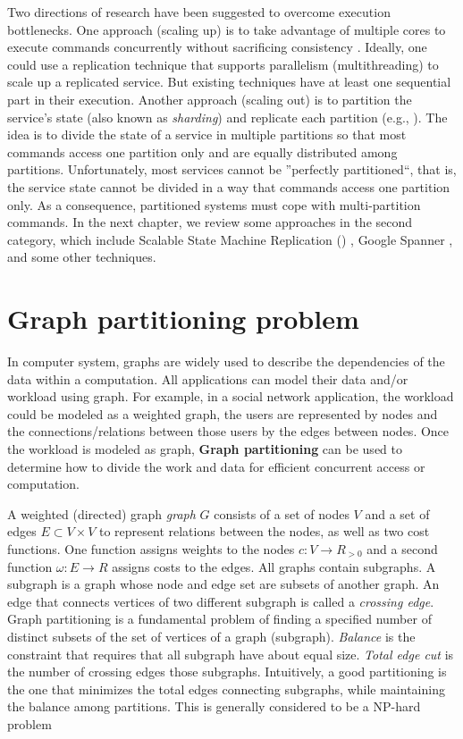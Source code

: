 Two directions of research have been suggested to overcome execution
bottlenecks. One approach (scaling up) is to take advantage of multiple cores to
execute commands concurrently without sacrificing consistency
\cite{Kapritsos:2012um,Marandi:2014bj,Kotla:2004ep,Guo:2014jp}. Ideally, one
could use a replication technique that supports parallelism (multithreading) to
scale up a replicated service. But existing techniques have at least one
sequential part in their execution. Another approach (scaling out) is to
partition the service's state (also known as \emph{sharding}) and replicate each
partition (e.g., \cite{Glendenning:2011kj,Marandi:2011dj}). The idea is to
divide the state of a service in multiple partitions so that most commands
access one partition only and are equally distributed among partitions.
Unfortunately, most services cannot be ''perfectly partitioned``, that is, the
service state cannot be divided in a way that commands access one partition
only. As a consequence, partitioned systems must cope with multi-partition
commands. In the next chapter, we review some approaches in the second category,
which include Scalable State Machine Replication (\ssmr) \cite{bezerra2014ssmr},
Google Spanner \cite{corbett2013spanner}, and some other techniques.


\section{Graph partitioning problem}

In computer system, graphs are widely used to describe the dependencies of the
data within a computation. All applications can model their data and/or workload
using graph. For example, in a social network application, the workload could be
modeled as a weighted graph, the users are represented by nodes and the
connections/relations between those users by the edges between nodes. Once the
workload is modeled as graph, \textbf{Graph partitioning} can be used to
determine how to divide the work and data for efficient concurrent access or
computation.

A weighted (directed) graph \emph{graph} $G$ consists of a set of nodes $V$ and
a set of edges $E \subset V \times V$ to represent relations between the nodes,
as well as two cost functions. One function assigns weights to the nodes $c : V
\rightarrow R_{>0}$ and a second function $\omega : E \rightarrow R$ assigns
costs to the edges. All graphs contain subgraphs. A subgraph is a graph whose
node and edge set are subsets of another graph. An edge that connects vertices
of two different subgraph is called a \emph{crossing edge}. Graph partitioning
is a fundamental problem of finding a specified number of distinct subsets of
the set of vertices of a graph (subgraph). \emph{Balance} is the constraint that
requires that all subgraph have about equal size. \emph{Total edge cut} is the
number of crossing edges those subgraphs. Intuitively, a good partitioning is
the one that minimizes the total edges connecting subgraphs, while maintaining
the balance among partitions. This is generally considered to be a NP-hard
problem \cite{10.1006/jpdc.1997.1404}

